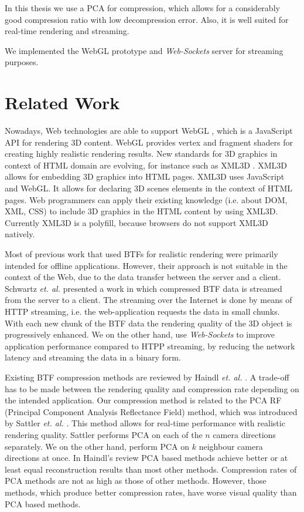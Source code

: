 In this thesis we use a PCA for compression, which allows for a considerably good compression ratio with low decompression error.
Also, it is well suited for real-time rendering and streaming.

We implemented the WebGL prototype and \emph{Web-Sockets} server for streaming purposes.



\section{Related Work}
\label{section:related_work}

Nowadays, Web technologies are able to support WebGL \cite{webgl}, which is a JavaScript API for rendering 3D content.
WebGL provides  vertex and fragment shaders  for creating highly realistic rendering results.
New standards for 3D graphics in context of HTML domain are evolving, for instance such as XML3D \cite{xml3d}.
XML3D allows for embedding 3D graphics into HTML pages. XML3D uses JavaScript and WebGL.
It allows for declaring 3D scenes elements in the context of HTML pages.
Web programmers can apply their existing knowledge (i.e. about DOM, XML, CSS) to include 3D graphics in the HTML content by using XML3D.
Currently XML3D  is a polyfill, because browsers do not support XML3D natively.
 
Most of previous work that used BTFs for realistic rendering were primarily intended  for offline applications.
However, their approach is not suitable in the context of the Web, due to the data transfer between the server and a client.
  Schwartz \emph{et. al.} \cite{webglbtfstreaming} presented a work in which compressed BTF data is streamed from the server to a client.
 The streaming over the Internet is done by means of HTTP streaming, i.e. the web-application requests the data in small chunks.
 With each new chunk of the BTF data the rendering quality of the 3D object is progressively enhanced.
 We on the other hand, use \emph{Web-Sockets} to improve application performance compared to HTPP streaming, by reducing the network latency and streaming the data in a binary form.

 
Existing BTF compression methods are reviewed by Haindl \emph{et. al.} \cite{haindl, haindl_visual}.
A trade-off has to be made between the rendering quality and compression rate depending on the intended application.
 Our compression method is related to the PCA RF (Principal Component Analysis Reflectance Field) method, which was introduced by Sattler \emph{et. al.} \cite{star2004}.
This method allows for real-time performance with realistic rendering quality. 
Sattler performs PCA on each of the $n$ camera directions separately. We on the other hand, perform PCA on $k$ neighbour camera directions at once.
In Haindl's review \cite{haindl} PCA based methods achieve better or at least equal reconstruction results than most other methods.
Compression rates of PCA methods are not as high as those of other methods. However, those methods, which produce better compression rates, have worse visual quality than PCA based methods.






